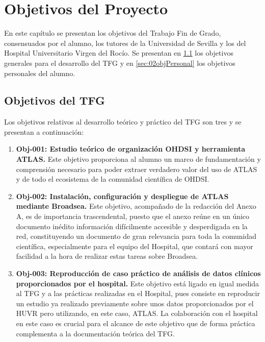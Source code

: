 \chapter{Objetivos del Proyecto}\label{cap:02objetivos}

En este capítulo se presentan los objetivos del Trabajo Fin de Grado, consensuados por el alumno, los tutores de la Universidad de Sevilla y los del Hospital Universitario Virgen del Rocío. Se presentan en \ref{sec:02objTFG} los objetivos generales para el desarrollo del TFG y en \ref{sec:02objPersonal} los objetivos personales del alumno.

\section{Objetivos del TFG} \label{sec:02objTFG}

Los objetivos relativos al desarrollo teórico y práctico del TFG son tres y se presentan a continuación:

%

\begin{enumerate}

    \item \textbf{Obj-001: Estudio teórico de organización OHDSI y herramienta ATLAS.} Este objetivo proporciona al alumno un marco de fundamentación y comprensión necesario para poder extraer verdadero valor del uso de ATLAS y de todo el ecosistema de la comunidad científica de OHDSI.

    \item \textbf{Obj-002: Instalación, configuración y despliegue de ATLAS mediante Broadsea.} Este objetivo, acompañado de la redacción del Anexo A, es de importancia trascendental, puesto que el anexo reúne en un único documento inédito información difícilmente accesible y desperdigada en la red, constituyendo un documento de gran relevancia para toda la comunidad científica, especialmente para el equipo del Hospital, que contará con mayor facilidad a la hora de realizar estas tareas sobre Broadsea.

    \item \textbf{Obj-003: Reproducción de caso práctico de análisis de datos clínicos proporcionados por el hospital.} Este objetivo está ligado en igual medida al TFG y a las prácticas realizadas en el Hospital, pues consiste en reproducir un estudio ya realizado previamente sobre unos datos proporcionados por el HUVR pero utilizando, en este caso, ATLAS. La colaboración con el hospital en este caso es crucial para el alcance de este objetivo que de forma práctica complementa a la documentación teórica del TFG.

\end{enumerate}

